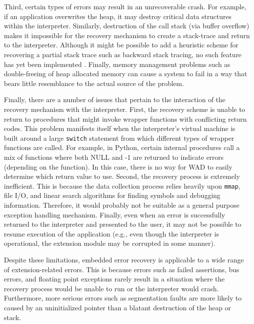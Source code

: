 %

Third, certain types of errors may result in an unrecoverable crash.
For example, if an application overwrites the heap, it may destroy
critical data structures within the interpreter. 
Similarly,
destruction of the call stack (via buffer overflow) makes it
impossible for the recovery mechanism to create a stack-trace and
return to the interpreter.  Although it might be possible to add a heuristic scheme for
recovering a partial stack trace such as backward stack tracing, no such feature has yet been implemented
\cite{debug}.  Finally, memory management problems such as
double-freeing of heap allocated memory can cause a system to fail in
a way that bears little resemblance to the actual source of the
problem.

%
%

Finally, there are a number of issues that pertain
to the interaction of the recovery mechanism with the interpreter.
First, the recovery scheme is unable to return to procedures
that might invoke wrapper functions with conflicting return codes.
This problem manifests itself when the interpreter's virtual
machine is built around a large {\tt switch} statement from which different
types of wrapper functions are called.  For example, in Python, certain
internal procedures call a mix of functions where both NULL and -1 are
returned to indicate errors (depending on the function).  In this case, there
is no way for WAD to easily determine which return value to use.  Second,
the recovery process is extremely inefficient.  This is because the
data collection process relies heavily upon {\tt mmap}, file I/O, and linear search
algorithms for finding symbols and debugging information.  Therefore, it would
probably not be suitable as a general purpose exception handling mechanism.
Finally, even when an error is successfully returned to the interpreter
and presented to the user, it may not be possible to resume execution of
the application (e.g., even though the interpreter is operational, the extension
module may be corrupted in some manner).

Despite these limitations, embedded error recovery is applicable to a
wide range of extension-related errors.  This is because errors such as
failed assertions, bus errors, and floating point exceptions rarely
result in a situation where the recovery process would be unable to run or the
interpreter would crash. Furthermore, more serious errors such as segmentation faults are more
likely to caused by an uninitialized pointer than a blatant
destruction of the heap or stack.

